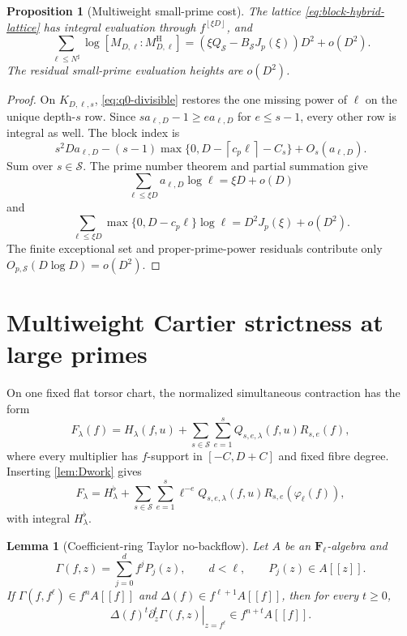 \documentclass[11pt]{article}
\newtheorem{proposition}[proposition]{Proposition}
\newtheorem{lemma}[lemma]{Lemma}
\theoremstyle{definition}
\theoremstyle{remark}
\newcommand{\F}{\mathbf F}
\newcommand{\floor}[1]{\left\lfloor #1\right\rfloor}
\newcommand{\ceil}[1]{\left\lceil #1\right\rceil}
\begin{document}
\begin{proposition}[Multiweight small-prime cost]\label{prop:small-cost}
The lattice \eqref{eq:block-hybrid-lattice} has integral evaluation through
$f^{\floor{\xi D}}$, and
\begin{equation}\label{eq:small-cost}
 \sum_{\ell\le N^\sharp}
 \log[M_{D,\ell}:M^{\mathrm H}_{D,\ell}]
 =\left(\xi Q_{\mathcal S}-B_{\mathcal S}J_p(\xi)\right)D^2+o(D^2).
\end{equation}
The residual small-prime evaluation heights are $o(D^2)$.
\end{proposition}

\begin{proof}
On $K_{D,\ell,s}$, \eqref{eq:q0-divisible} restores the one missing power of
$\ell$ on the unique depth-$s$ row.  Since
$sa_{\ell,D}-1\ge ea_{\ell,D}$ for $e\le s-1$, every other row is integral as
well.  The block index is
\[
 s^2Da_{\ell,D}
 -(s-1)\max\{0,D-\ceil{c_p\ell}-C_s\}
 +O_s(a_{\ell,D}).
\]
Sum over $s\in\mathcal S$.  The prime number theorem and partial summation give
\[
 \sum_{\ell\le\xi D}a_{\ell,D}\log\ell=\xi D+o(D)
\]
and
\[
 \sum_{\ell\le\xi D}
 \max\{0,D-c_p\ell\}\log\ell
 =D^2J_p(\xi)+o(D^2).
\]
The finite exceptional set and proper-prime-power residuals contribute only
$O_{p,\mathcal S}(D\log D)=o(D^2)$.
\end{proof}

\section{Multiweight Cartier strictness at large primes}\label{sec:Cartier}

On one fixed flat torsor chart, the normalized simultaneous contraction has
the form
\begin{equation}\label{eq:multi-torsor}
 F_\lambda(f)=H_\lambda(f,u)+
 \sum_{s\in\mathcal S}\sum_{e=1}^s
 Q_{s,e,\lambda}(f,u)R_{s,e}(f),
\end{equation}
where every multiplier has $f$-support in $[-C,D+C]$ and fixed fibre degree.
Inserting \cref{lem:Dwork} gives
\begin{equation}\label{eq:multi-Dwork}
 F_\lambda=H_\lambda^\flat+
 \sum_{s\in\mathcal S}\sum_{e=1}^s
 \ell^{-e}Q_{s,e,\lambda}(f,u)
 R_{s,e}(\varphi_\ell(f)),
\end{equation}
with integral $H_\lambda^\flat$.

\begin{lemma}[Coefficient-ring Taylor no-backflow]\label{lem:no-backflow}
Let $A$ be an $\F_\ell$-algebra and
\[
 \Gamma(f,z)=\sum_{j=0}^df^jP_j(z),
 \qquad d<\ell,
 \qquad P_j(z)\in A[[z]].
\]
If $\Gamma(f,f^\ell)\in f^nA[[f]]$ and
$\Delta(f)\in f^{\ell+1}A[[f]]$, then for every $t\ge0$,
\begin{equation}\label{eq:no-backflow}
 \Delta(f)^t
 \left.\partial_z^t\Gamma(f,z)\right|_{z=f^\ell}
 \in f^{n+t}A[[f]].
\end{equation}
\end{lemma}
\end{document}
